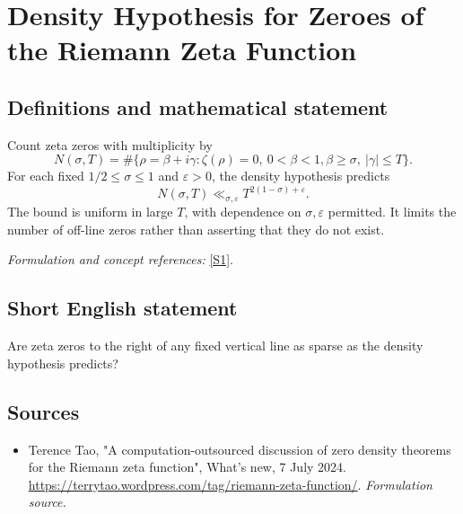 \documentclass[11pt]{article}
\begin{document}
\section*{\texorpdfstring{Density Hypothesis for Zeroes of the Riemann Zeta Function}{Density Hypothesis for Zeroes of the Riemann Zeta Function}}\label{128}
\subsection{Definitions and mathematical statement}
Count zeta zeros with multiplicity by
\[
 N(\sigma,T)=\#\{\rho=\beta+i\gamma:\zeta(\rho)=0,\ 0<\beta<1,
                                  \beta\ge\sigma,\ |\gamma|\le T\}.
\]
For each fixed $1/2\le\sigma\le1$ and $\varepsilon>0$, the density hypothesis predicts
\[
 N(\sigma,T)\ll_{\sigma,\varepsilon}T^{2(1-\sigma)+\varepsilon}.
\]
The bound is uniform in large $T$, with dependence on $\sigma,\varepsilon$ permitted. It limits the number of off-line zeros rather than asserting that they do not exist.
\par\smallskip\textit{Formulation and concept references:} \href{https://terrytao.wordpress.com/tag/riemann-zeta-function/}{[S1]}.

\subsection{Short English statement}
Are zeta zeros to the right of any fixed vertical line as sparse as the density hypothesis predicts?
\subsection{Sources}
\begin{itemize}
\item[S1]Terence Tao, "A computation-outsourced discussion of zero density theorems for the Riemann zeta function", What's new, 7 July 2024.
\url{https://terrytao.wordpress.com/tag/riemann-zeta-function/}.
\textit{Formulation source.}
\end{itemize}
\end{document}
